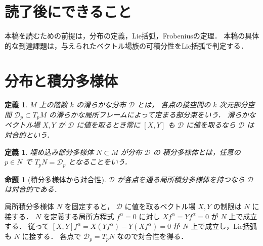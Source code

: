 \documentclass[a5paper,10pt,onecolumn]{jsarticle}
\makeatletter
\theoremstyle{mathnotetheorem}
\newtheorem{definition}[theorem]{定義}
\newtheorem{proposition}[theorem]{命題}
\renewcommand{\proofname}{証明}
\renewenvironment{proof}[1][\proofname]{%
  \par\pushQED{\qed}\normalfont\topsep4\p@\@plus2\p@\relax
  \trivlist\item[\hskip\labelsep\bfseries #1]\ignorespaces
}{\popQED\endtrivlist\@endpefalse}
\makeatother
\begin{document}
\section*{読了後にできること}
本稿を読むための前提は，分布の定義，Lie括弧，Frobeniusの定理．
本稿の具体的な到達課題は，与えられたベクトル場族の可積分性をLie括弧で判定する．


\section{分布と積分多様体}
\begin{definition}
$M$ 上の階数 $k$ の滑らかな分布 $\mathcal D$ とは，
各点の接空間の $k$ 次元部分空間 $\mathcal D_p\subset T_pM$
の滑らかな局所フレームによって定まる部分束をいう．
滑らかなベクトル場 $X,Y$ が
$\mathcal D$ に値を取るとき常に
$[X,Y]$ も $\mathcal D$ に値を取るなら
$\mathcal D$ は対合的という．
\end{definition}
\begin{definition}
埋め込み部分多様体 $N\subset M$ が分布 $\mathcal D$ の
積分多様体とは，任意の $p\in N$ で
$T_pN=\mathcal D_p$ となることをいう．
\end{definition}
\begin{proposition}[積分多様体から対合性]
$\mathcal D$ が各点を通る局所積分多様体を持つなら
$\mathcal D$ は対合的である．
\end{proposition}
\begin{proof}
局所積分多様体 $N$ を固定すると，
$\mathcal D$ に値を取るベクトル場 $X,Y$ の制限は
$N$ に接する．
$N$ を定義する局所方程式 $f^\alpha=0$ に対し
$Xf^\alpha=Yf^\alpha=0$ が $N$ 上で成立する．
従って $[X,Y]f^\alpha=X(Yf^\alpha)-Y(Xf^\alpha)=0$
が $N$ 上で成立し，Lie括弧も $N$ に接する．
各点で $\mathcal D_p=T_pN$ なので対合性を得る．
\end{proof}
\end{document}
